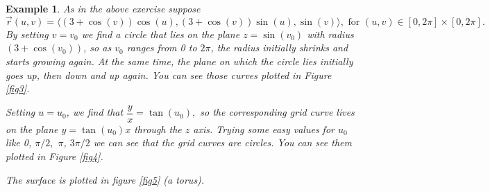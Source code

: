 \documentclass[12pt]{article}
\newcommand{\vr}{\vec{r}{}}
\renewcommand{\lg}{\langle}
\newcommand{\rg}{\rangle}
\newtheorem{example}{Example}
\begin{document}
\begin{example}
As in the above exercise suppose $$\vr(u,v)=\lg (3+\cos(v))\cos(u),(3+\cos(v))\sin(u),\sin(v)\rg, \text{ for }(u,v)\in [0,2\pi]\times[0,2\pi].$$ By setting $v=v_0$ we find a circle that lies on the plane $z=\sin(v_0)$  with radius $(3+\cos(v_0))$, so as $v_0$ ranges from 0 to $2\pi$, the radius initially shrinks and starts growing again. At the same time, the plane on which the circle lies initially goes up, then down and up again. You can see those curves plotted in Figure \ref{fig3}.

Setting $u=u_0$, we find that $\dfrac{y}{x} =\tan(u_0),$ so the corresponding grid curve lives on the plane $y=\tan(u_0)x$ through the $z$ axis. Trying some easy values for $u_0$ like 0, $\pi/2,$ $\pi$, $3\pi/2$ we can see that the grid curves are circles. You can see them plotted in Figure \ref{fig4}.

The surface is plotted in figure \ref{fig5} (a torus).


\end{example}
\end{document}
